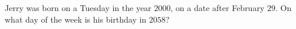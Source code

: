 Jerry was born on a Tuesday in the year $2000$, on a date after February $29$. On what day of the week is his birthday in $2058$?
